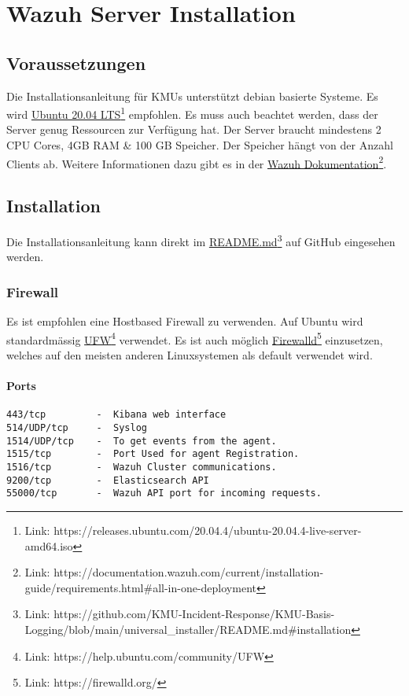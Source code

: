 \chapter{Wazuh Server Installation}

\section{Voraussetzungen}
Die Installationsanleitung für KMUs unterstützt debian basierte Systeme.
Es wird \href{https://releases.ubuntu.com/20.04.4/ubuntu-20.04.4-live-server-amd64.iso}{Ubuntu 20.04 LTS}\footnote{Link: https://releases.ubuntu.com/20.04.4/ubuntu-20.04.4-live-server-amd64.iso} empfohlen.
Es muss auch beachtet werden, dass der Server genug Ressourcen zur Verfügung hat.
Der Server braucht mindestens 2 CPU Cores, 4GB RAM \& 100 GB Speicher.
Der Speicher hängt von der Anzahl Clients ab.
Weitere Informationen dazu gibt es in der \href{https://documentation.wazuh.com/current/installation-guide/requirements.html\#all-in-one-deployment}{Wazuh Dokumentation}\footnote{Link: https://documentation.wazuh.com/current/installation-guide/requirements.html\#all-in-one-deployment}.

\section{Installation}
Die Installationsanleitung kann direkt im \href{https://github.com/KMU-Incident-Response/KMU-Basis-Logging/blob/main/universal\_installer/README.md\#installation}{README.md}\footnote{Link: https://github.com/KMU-Incident-Response/KMU-Basis-Logging/blob/main/universal\_installer/README.md\#installation} auf GitHub eingesehen werden.


\subsection{Firewall}
Es ist empfohlen eine Hostbased Firewall zu verwenden.
Auf Ubuntu wird standardmässig \href{https://help.ubuntu.com/community/UFW}{UFW}\footnote{Link: https://help.ubuntu.com/community/UFW} verwendet.
Es ist auch möglich \href{https://firewalld.org/}{Firewalld}\footnote{Link: https://firewalld.org/} einzusetzen, welches auf den meisten anderen Linuxsystemen als default verwendet wird.

\subsubsection{Ports}
\begin{lstlisting}
443/tcp         -  Kibana web interface
514/UDP/tcp     -  Syslog
1514/UDP/tcp    -  To get events from the agent.
1515/tcp        -  Port Used for agent Registration.
1516/tcp        -  Wazuh Cluster communications.
9200/tcp        -  Elasticsearch API
55000/tcp       -  Wazuh API port for incoming requests.
\end{lstlisting}





